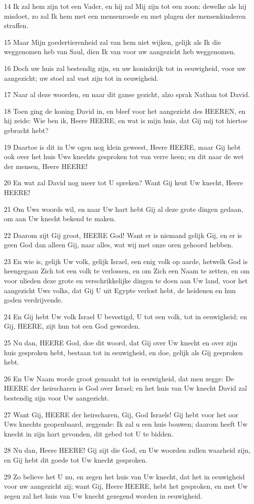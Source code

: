 \par 14 Ik zal hem zijn tot een Vader, en hij zal Mij zijn tot een zoon; dewelke als hij misdoet, zo zal Ik hem met een mensenroede en met plagen der mensenkinderen straffen.
\par 15 Maar Mijn goedertierenheid zal van hem niet wijken, gelijk als Ik die weggenomen heb van Saul, dien Ik van voor uw aangezicht heb weggenomen.
\par 16 Doch uw huis zal bestendig zijn, en uw koninkrijk tot in eeuwigheid, voor uw aangezicht; uw stoel zal vast zijn tot in eeuwigheid.
\par 17 Naar al deze woorden, en naar dit ganse gezicht, alzo sprak Nathan tot David.
\par 18 Toen ging de koning David in, en bleef voor het aangezicht des HEEREN, en hij zeide: Wie ben ik, Heere HEERE, en wat is mijn huis, dat Gij mij tot hiertoe gebracht hebt?
\par 19 Daartoe is dit in Uw ogen nog klein geweest, Heere HEERE, maar Gij hebt ook over het huis Uws knechts gesproken tot van verre heen; en dit naar de wet der mensen, Heere HEERE!
\par 20 En wat zal David nog meer tot U spreken? Want Gij kent Uw knecht, Heere HEERE!
\par 21 Om Uws woords wil, en naar Uw hart hebt Gij al deze grote dingen gedaan, om aan Uw knecht bekend te maken.
\par 22 Daarom zijt Gij groot, HEERE God! Want er is niemand gelijk Gij, en er is geen God dan alleen Gij, naar alles, wat wij met onze oren gehoord hebben.
\par 23 En wie is, gelijk Uw volk, gelijk Israel, een enig volk op aarde, hetwelk God is heengegaan Zich tot een volk te verlossen, en om Zich een Naam te zetten, en om voor ulieden deze grote en verschrikkelijke dingen te doen aan Uw land, voor het aangezicht Uws volks, dat Gij U uit Egypte verlost hebt, de heidenen en hun goden verdrijvende.
\par 24 En Gij hebt Uw volk Israel U bevestigd, U tot een volk, tot in eeuwigheid; en Gij, HEERE, zijt hun tot een God geworden.
\par 25 Nu dan, HEERE God, doe dit woord, dat Gij over Uw knecht en over zijn huis gesproken hebt, bestaan tot in eeuwigheid, en doe, gelijk als Gij gesproken hebt.
\par 26 En Uw Naam worde groot gemaakt tot in eeuwigheid, dat men zegge: De HEERE der heirscharen is God over Israel; en het huis van Uw knecht David zal bestendig zijn voor Uw aangezicht.
\par 27 Want Gij, HEERE der heirscharen, Gij, God Israels! Gij hebt voor het oor Uws knechts geopenbaard, zeggende: Ik zal u een huis bouwen; daarom heeft Uw knecht in zijn hart gevonden, dit gebed tot U te bidden.
\par 28 Nu dan, Heere HEERE! Gij zijt die God, en Uw woorden zullen waarheid zijn, en Gij hebt dit goede tot Uw knecht gesproken.
\par 29 Zo believe het U nu, en zegen het huis van Uw knecht, dat het in eeuwigheid voor uw aangezicht zij; want Gij, Heere HEERE, hebt het gesproken, en met Uw zegen zal het huis van Uw knecht gezegend worden in eeuwigheid.

